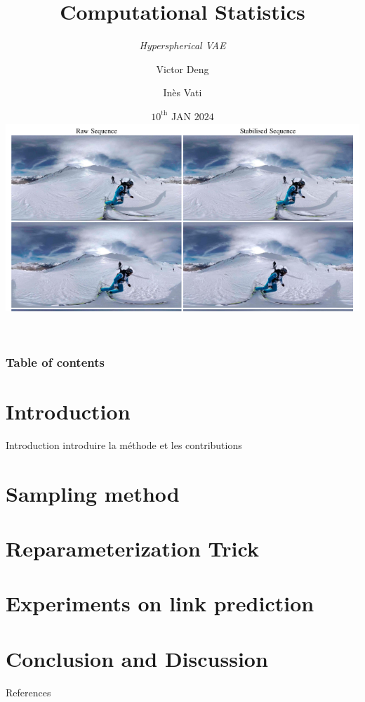 \documentclass[hyperref={pdftex}]{beamer}
\title{Computational Statistics}
\subtitle{\textit{Hyperspherical VAE}}
\author{Victor Deng \and Inès Vati}
\institute[MVA]{École Normale Supérieure Paris-Saclay, Master MVA}
\date{$10^{\textrm{th}}$ JAN $2024$\\ \vspace{0.3cm} \includegraphics[scale=0.2]{figures/spherical_video.png}}
\begin{document}
\frame[plain]{\titlepage}

\begin{frame}
   \frametitle{Table of contents}
   \tableofcontents[subsectionstyle=hide]
\end{frame} 

\section{Introduction} 
\begin{frame}{Introduction}
  introduire la méthode et les contributions \cite{davidson_hyperspherical_2022}
  \end{frame}

\section{Sampling method}



\section{Reparameterization Trick}


\section{Experiments on link prediction}



\section{Conclusion and Discussion} 


\begin{frame}{References}
  
\end{frame}
\end{document}
